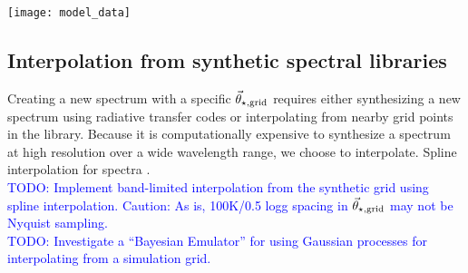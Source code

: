 \documentclass[preprint]{aastex} %
\newcommand{\vt}{\vec{\theta}}
\newcommand{\vg}{\vt_{\star, {\rm grid}}}
\newcommand{\todo}[1]{ \textcolor{Blue}{\\TODO: #1}}
\begin{document}
\begin{figure*}[!htb]
\begin{center}
  \texttt{[image: model\_data]}
  \caption{\textbf{Top}: Chebyshev polynomial which modifies the model spectrum to account for inaccuracies in the flux-calibration. \textbf{Middle}: The data spectrum and model spectrum, after it has been interpolated, post-processed, and multiplied by the Chebyshev polynomial. \textbf{Bottom}: Residuals from the model fit. Note the large residual at $\lambda5189$\AA\ due to a missing opacity source from . \protect \todo{Model spectrum will be updated once I properly burn in the chain. Do these line styles look OK? I was going for something legible that might also print well in B/W}.}
\label{fig:model_data}
\end{center}
\end{figure*}

\subsection{Interpolation from synthetic spectral libraries}
Creating a new spectrum with a specific $\vg$ requires either synthesizing a new spectrum using radiative transfer codes or interpolating from nearby grid points in the library. Because it is computationally expensive to synthesize a spectrum at high resolution over a wide wavelength range, we choose to interpolate. Spline interpolation for spectra \citep{hus12}.
\todo{Implement band-limited interpolation from the synthetic grid using spline interpolation. Caution: As is, 100K/0.5 logg spacing in $\vg$ may not be Nyquist sampling.}
\todo{Investigate a ``Bayesian Emulator'' for using Gaussian processes for interpolating from a simulation grid.}
\end{document}
